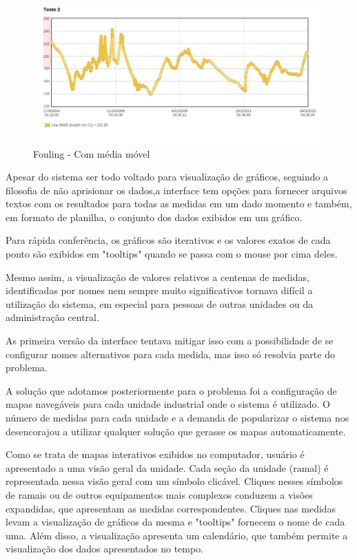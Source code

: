 \documentclass[]{article}
\begin{document}
\begin{figure}[!ht]
\centering
\includegraphics[scale=.5]{./fouling_suavizada}
\caption{Fouling - Com média móvel}
\label{fig:fouling_suavizada}
\end{figure}

Apesar do sistema ser todo voltado para visualização de gráficos, seguindo a filosofia de não aprisionar os dados,a interface tem opções para fornecer arquivos textos com os resultados para todas as medidas em um dado momento e também, em formato de planilha, o conjunto dos dados exibidos em um gráfico. 

Para rápida conferência, os gráficos são iterativos e os valores exatos de cada ponto são exibidos em "tooltips" quando se passa com o mouse por cima deles.

Mesmo assim, a visualização de valores relativos a centenas de medidas, identificadas por nomes nem sempre muito significativos tornava difícil a utilização do sistema, em especial para pessoas de outras unidades ou da administração central. 

As primeira versão da interface tentava mitigar isso com a possibilidade de se configurar nomes alternativos para cada medida, mas isso só resolvia parte do problema.

A solução que adotamos posteriormente para o problema foi a configuração de mapas navegáveis para cada unidade industrial onde o sistema é utilizado. O número de medidas para cada unidade e a demanda de popularizar o sistema nos desencorajou a utilizar qualquer solução que gerasse os mapas automaticamente.

Como se trata de mapas interativos exibidos no computador, usuário é apresentado a uma visão geral da unidade. Cada seção da unidade (ramal) é representada nessa visão geral com um símbolo clicável. Cliques nesses símbolos de ramais ou de outros equipamentos mais complexos conduzem a visões expandidas, que apresentam as medidas correspondentes. Cliques nas medidas levam a visualização de gráficos da mesma e "tooltips" fornecem o nome de cada uma. Além disso, a visualização apresenta um calendário, que também permite a visualização dos dados apresentados no tempo.
\end{document}
